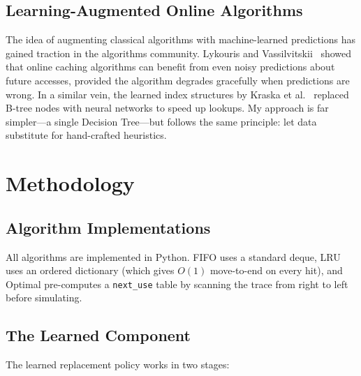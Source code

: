 \documentclass[11pt, a4paper]{article}
\begin{document}
\subsection{Learning-Augmented Online Algorithms}

The idea of augmenting classical algorithms with machine-learned predictions has gained traction in the algorithms community.
Lykouris and Vassilvitskii~\cite{lykouris2021} showed that online caching algorithms can benefit from even noisy predictions about future accesses, provided the algorithm degrades gracefully when predictions are wrong.
In a similar vein, the learned index structures by Kraska et al.~\cite{kraska2018} replaced B-tree nodes with neural networks to speed up lookups.
My approach is far simpler---a single Decision Tree---but follows the same principle: let data substitute for hand-crafted heuristics.


\section{Methodology}
\label{sec:method}

\subsection{Algorithm Implementations}

All algorithms are implemented in Python. FIFO uses a standard deque, LRU uses an ordered dictionary (which gives $O(1)$ move-to-end on every hit), and Optimal pre-computes a \texttt{next\_use} table by scanning the trace from right to left before simulating.

\subsection{The Learned Component}

The learned replacement policy works in two stages:
\end{document}
